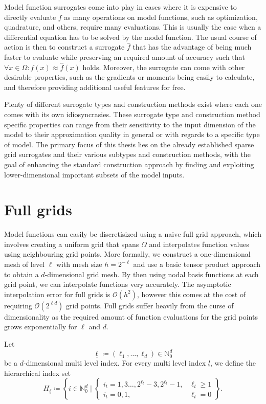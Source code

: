 \documentclass[
  a4paper,  %
  twoside,  %
  bibliography=totoc,
  headsepline,
  cleardoublepage=empty,
  parskip=half,
  draft=false
]{scrbook}
\begin{document}
Model function surrogates come into play in cases where it is expensive to directly evaluate $f$ as many operations on model functions, such as optimization, quadrature, and others, require many evaluations.
This is usually the case when a differential equation has to be solved by the model function.
The usual course of action is then to construct a surrogate $\hat{f}$ that has the advantage of being much faster to evaluate while preserving an required amount of accuracy such that $\forall x \in \Omega \colon f(x) \approx \hat{f}(x)$ holds.
Moreover, the surrogate can come with other desirable properties, such as the gradients or moments being easily to calculate, and therefore providing additional useful features for free.

Plenty of different surrogate types and construction methods exist where each one comes with its own idiosyncrasies.
These surrogate type and construction method specific properties can range from their sensitivity to the input dimension of the model to their approximation quality in general or with regards to a specific type of model. 
The primary focus of this thesis lies on the already established sparse grid surrogates and their various subtypes and construction methods, with the goal of enhancing the standard construction approach by finding and exploiting lower-dimensional important subsets of the model inputs.

\section{Full grids}

Model functions can easily be discretisized using a naive full grid approach, which involves creating a uniform grid that spans $\Omega$ and interpolates function values using neighbouring grid points.
More formally, we construct a one-dimensional mesh of level $\ell$ with mesh size $h=2^{-\ell}$ and use a basic tensor product approach to obtain a $d$-dimensional grid mesh.
By then using nodal basis functions at each grid point, we can interpolate functions very accurately.
The asymptotic interpolation error for full grids is $\mathcal{O}(h^2)$, however this comes at the cost of requiring $\mathcal{O}(2^{\ell d})$ grid points.
Full grids suffer heavily from the curse of dimensionality as the required amount of function evaluations for the grid points grows exponentially for $\ell$ and $d$.
\begin{definition}
Let
\begin{equation}
\underline{\ell} \coloneqq (\ell_1, \dots, \ell_d) \in \mathds{N}_0^d
\end{equation}
be a $d$-dimensional multi level index. For every multi level index $\underline{l}$, we define the hierarchical index set
\begin{equation}
H_{\underline{\ell}} \coloneqq \left\{ \underline{i} \in \mathds{N}^d_0 \mid
\begin{cases}
    i_t=1,3\dots,2^{\ell_t} - 3, 2^{\ell_t} - 1, & \ell_t \geq 1 \\
    i_t=0,1, & \ell_t = 0
\end{cases} \right\}.
\end{equation}
\end{definition}
\end{document}
